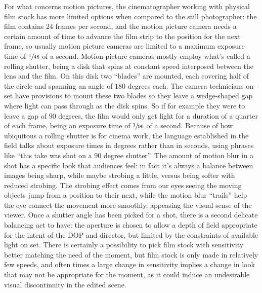 For what concerns motion pictures, the cinematographer working with physical film stock has more limited 
options when compared to the still photographer: the film contains 24 frames per second, and the motion
picture camera needs a certain amount of time to advance the film strip to the position for the next frame,
so usually motion picture cameras are limited to a maximum exposure time of $\sfrac1{48}$ of a second.
Motion picture cameras mostly employ what's called a \gls{rolling shutter}, being a disk that spins 
at constant speed interposed between the lens and the film. 
On this disk two ``blades'' are mounted, each covering half of the circle and spanning an angle of $180$ degrees each. 
The camera technicians on-set have provisions to mount these two blades so they leave a 
wedge-shaped gap where light can pass through as the disk spins.
So if for example they were to leave a gap of $90$ degrees, the film would only get light for a 
duration of a quarter of each frame, being an exposure time of $\sfrac1{96}$ of a second.
Because of how ubiquitous a rolling shutter is for cinema work, the language established in the field
talks about exposure times in degrees rather than in seconds, using phrases like 
``this take was shot on a 90 degree shutter''.
The amount of motion blur in a shot has a specific look that audiences feel: in fact it's 
always a balance between images being sharp, while maybe \gls{strobing} a little, versus being 
softer with reduced \gls{strobing}. The strobing effect comes from our eyes seeing the moving objects
jump from a position to their next, while the motion blur ``trails'' help the eye connect the 
movement more smoothly, appeasing the visual sense of the viewer.
Once a \gls{shutter} angle has been picked for a shot, there is a second delicate balancing act
to have: the \gls{aperture} is chosen to allow a depth of field appropriate for the intent
of the \gls{DOP} and director, but limited by the constraints of available light on set.
There is certainly a possibility to pick film stock with sensitivity better matching the need
of the moment, but film stock is only made in relatively few speeds, and often times a large change
in sensitivity implies a change in look that may not be appropriate for the moment, as it could
induce an undesirable visual discontinuity in the edited scene.

